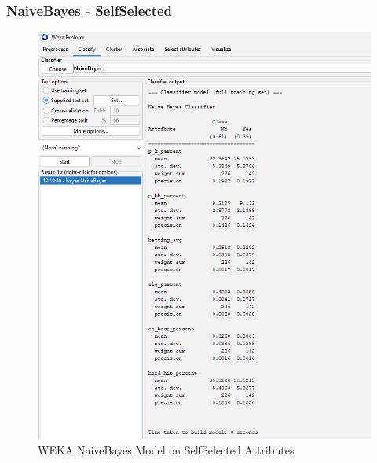 \documentclass[12pt]{article}
\begin{document}
\newpage
\subsubsection{NaiveBayes - SelfSelected}
\begin{figure}[h!]
    \includegraphics[scale=0.4]{./images/SelfSelected/NaiveBayes-Model.png}
\centering
    \caption{WEKA NaiveBayes Model on SelfSelected Attributes}
\end{figure}
\newpage
\end{document}
